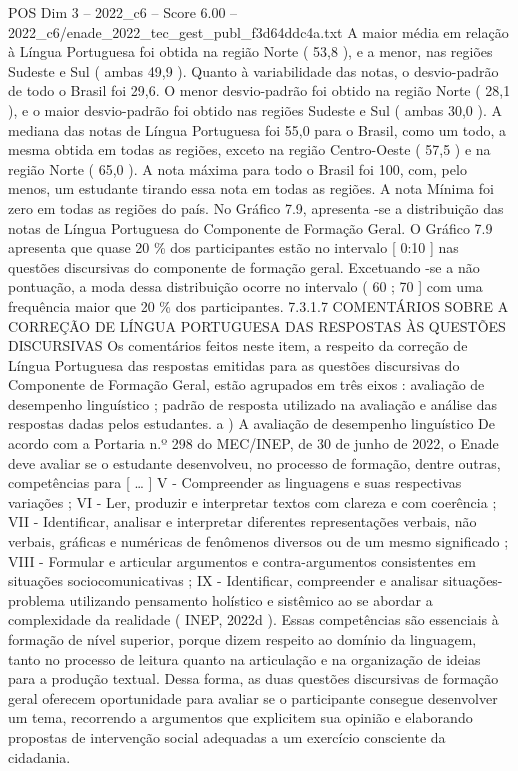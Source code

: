 \begin{textsample}{POS Dim 3 – 2022\_c6 – Score 6.00 – 2022\_c6/enade\_2022\_tec\_gest\_publ\_f3d64ddc4a.txt}
A maior média em relação à Língua Portuguesa foi obtida na região Norte ( 53,8 ), e a menor, nas regiões Sudeste e Sul ( ambas 49,9 ).
Quanto à variabilidade das notas, o desvio-padrão de todo o Brasil foi 29,6.
O menor desvio-padrão foi obtido na região Norte ( 28,1 ), e o maior desvio-padrão foi obtido nas regiões Sudeste e Sul ( ambas 30,0 ).
A mediana das notas de Língua Portuguesa foi 55,0 para o Brasil, como um todo, a mesma obtida em todas as regiões, exceto na região Centro-Oeste ( 57,5 ) e na região Norte ( 65,0 ).
A nota máxima para todo o Brasil foi 100, com, pelo menos, um estudante tirando essa nota em todas as regiões.
A nota Mínima foi zero em todas as regiões do país.
No Gráfico 7.9, apresenta -se a distribuição das notas de Língua Portuguesa do Componente de Formação Geral.
O Gráfico 7.9 apresenta que quase 20 \% dos participantes estão no intervalo [ 0:10 ] nas questões discursivas do componente de formação geral.
Excetuando -se a não pontuação, a moda dessa distribuição ocorre no intervalo ( 60 ; 70 ] com uma frequência maior que 20 \% dos participantes. 7.3.1.7 COMENTÁRIOS SOBRE A CORREÇÃO DE LÍNGUA PORTUGUESA DAS RESPOSTAS ÀS QUESTÕES DISCURSIVAS Os comentários feitos neste item, a respeito da correção de Língua Portuguesa das respostas emitidas para as questões discursivas do Componente de Formação Geral, estão agrupados em três eixos : avaliação de desempenho linguístico ; padrão de resposta utilizado na avaliação e análise das respostas dadas pelos estudantes. a ) A avaliação de desempenho linguístico De acordo com a Portaria n.º 298 do MEC/INEP, de 30 de junho de 2022, o Enade deve avaliar se o estudante desenvolveu, no processo de formação, dentre outras, competências para [ … ] V - Compreender as linguagens e suas respectivas variações ; VI - Ler, produzir e interpretar textos com clareza e com coerência ; VII - Identificar, analisar e interpretar diferentes representações verbais, não verbais, gráficas e numéricas de fenômenos diversos ou de um mesmo significado ; VIII - Formular e articular argumentos e contra-argumentos consistentes em situações sociocomunicativas ; IX - Identificar, compreender e analisar situações-problema utilizando pensamento holístico e sistêmico ao se abordar a complexidade da realidade ( INEP, 2022d ).
Essas competências são essenciais à formação de nível superior, porque dizem respeito ao domínio da linguagem, tanto no processo de leitura quanto na articulação e na organização de ideias para a produção textual.
Dessa forma, as duas questões discursivas de formação geral oferecem oportunidade para avaliar se o participante consegue desenvolver um tema, recorrendo a argumentos que explicitem sua opinião e elaborando propostas de intervenção social adequadas a um exercício consciente da cidadania.

\end{textsample}
